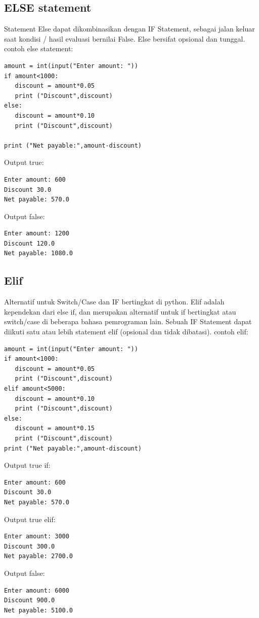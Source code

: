 \subsection{ELSE statement}
Statement Else dapat dikombinasikan dengan IF Statement, sebagai jalan keluar saat kondisi / hasil evaluasi bernilai False. Else bersifat opsional dan tunggal.
contoh else statement:
\begin{verbatim}
amount = int(input("Enter amount: "))
if amount<1000:
   discount = amount*0.05
   print ("Discount",discount)
else:
   discount = amount*0.10
   print ("Discount",discount)
   
print ("Net payable:",amount-discount)
\end{verbatim}
Output true:
\begin{verbatim}
Enter amount: 600
Discount 30.0
Net payable: 570.0
\end{verbatim}
Output false:
\begin{verbatim}
Enter amount: 1200
Discount 120.0
Net payable: 1080.0
\end{verbatim}

\subsection{Elif}
Alternatif untuk Switch/Case dan IF bertingkat di python. Elif adalah kependekan dari else if, dan merupakan alternatif untuk if bertingkat atau switch/case di beberapa bahasa pemrograman lain. Sebuah IF Statement dapat diikuti satu atau lebih statement elif (opsional dan tidak dibatasi).
contoh elif:
\begin{verbatim}
amount = int(input("Enter amount: "))
if amount<1000:
   discount = amount*0.05
   print ("Discount",discount)
elif amount<5000:
   discount = amount*0.10
   print ("Discount",discount)
else:
   discount = amount*0.15
   print ("Discount",discount)
print ("Net payable:",amount-discount)
\end{verbatim}
Output true if:
\begin{verbatim}
Enter amount: 600
Discount 30.0
Net payable: 570.0
\end{verbatim}
Output true elif:
\begin{verbatim}
Enter amount: 3000
Discount 300.0
Net payable: 2700.0
\end{verbatim}
Output false:
\begin{verbatim}
Enter amount: 6000
Discount 900.0
Net payable: 5100.0
\end{verbatim}

